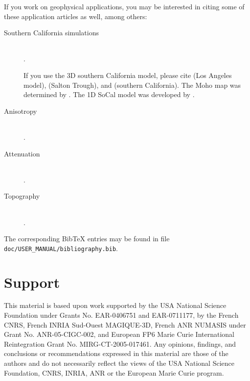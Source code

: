\noindent If you work on geophysical applications, you may be interested
in citing some of these application articles as well, among others:
\begin{description}
\item [{Southern California simulations}] ~\\
 \citet{KoLiTrSuStSh04,KrJiKoTr06a,KrJiKoTr06b}.


If you use the 3D southern California model, please cite \citet{SuSh03}
(Los Angeles model), \citet{lovelyetal06} (Salton Trough), and \citet{hauksson2000}
(southern California). The Moho map was determined by \citet{zhukanamori2000}.
The 1D SoCal model was developed by \citet{DrHe90}.

\item [{Anisotropy}] ~\\
 \citet{ChTr07,JiTsKoTr05,ChFaKo04,FaChKo04,RiRiKoTrHe02,TrKo00}.
\item [{Attenuation}] ~\\
 \citet{SaKoTr10,KoTr02a,KoTr99}.
\item [{Topography}] ~\\
 \citet{LeKoHuTr09,LeChKoHuTr09,LeChLiKoHuTr08,GoAmTaCaSmSaMaKo09,WiKoScTr04}.
\end{description}
The corresponding Bib\TeX{} entries may be found in file \texttt{doc/USER\_MANUAL/bibliography.bib}.


\section{Support}

This material is based upon work supported by the USA National Science
Foundation under Grants No. EAR-0406751 and EAR-0711177, by the French
CNRS, French INRIA Sud-Ouest MAGIQUE-3D, French ANR NUMASIS under
Grant No. ANR-05-CIGC-002, and European FP6 Marie Curie International
Reintegration Grant No. MIRG-CT-2005-017461. Any opinions, findings,
and conclusions or recommendations expressed in this material are
those of the authors and do not necessarily reflect the views of the
USA National Science Foundation, CNRS, INRIA, ANR or the European
Marie Curie program.


